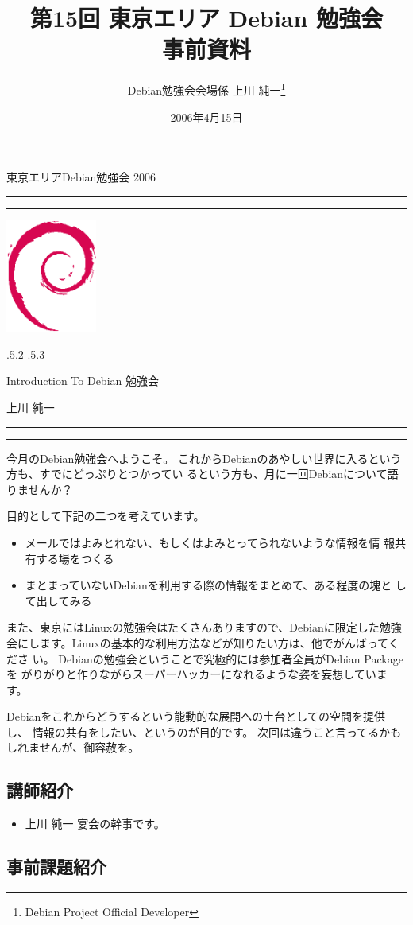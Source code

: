 \documentclass[mingoth,a4paper]{jsarticle}
\makeatletter
\renewcommand{\section}{\@startsection{section}{1}{\z@}%
    {\Cvs \@plus.5\Cdp \@minus.2\Cdp}%
    {.5\Cvs \@plus.3\Cdp}%
    {\normalfont\Large\headfont\raggedright\centering}} %
\newcommand{\dancersection}[2]{%
\newpage
東京エリアDebian勉強会 2006
\hrule
\vspace{0.5mm}
\hrule
\hfill{}\includegraphics[width=3cm]{image200502/openlogo-nd.eps}\\
\vspace{-4cm}
\begin{center}
  \section{#1}
\end{center}
\hfill{}#2\hspace{3cm}\space\\
\hrule
\hrule
\vspace{1cm}
}
\makeatother
\begin{document}
\begin{titlepage}

\title{
 第15回 東京エリア Debian 勉強会\\事前資料}
\date{2006年4月15日}
\author{Debian勉強会会場係 上川 純一\thanks{Debian Project Official Developer}} 
\maketitle
\thispagestyle{empty}
\end{titlepage}

\newpage
\tableofcontents

\dancersection{Introduction To Debian 勉強会}{上川 純一}

今月のDebian勉強会へようこそ。
これからDebianのあやしい世界に入るという方も、すでにどっぷりとつかってい
るという方も、月に一回Debianについて語りませんか？

目的として下記の二つを考えています。

\begin{itemize}
 \item メールではよみとれない、もしくはよみとってられないような情報を情
       報共有する場をつくる
 \item まとまっていないDebianを利用する際の情報をまとめて、ある程度の塊と
       して出してみる
\end{itemize}

また、東京にはLinuxの勉強会はたくさんありますので、Debianに限定した勉強
会にします。Linuxの基本的な利用方法などが知りたい方は、他でがんばってくださ
い。
Debianの勉強会ということで究極的には参加者全員がDebian Packageを
がりがりと作りながらスーパーハッカーになれるような姿を妄想しています。

Debianをこれからどうするという能動的な展開への土台としての空間を提供し、
情報の共有をしたい、というのが目的です。
次回は違うこと言ってるかもしれませんが、御容赦を。

\subsection{講師紹介}

\begin{itemize}
 \item{上川 純一} 宴会の幹事です。
\end{itemize}

\subsection{事前課題紹介}
\end{document}
